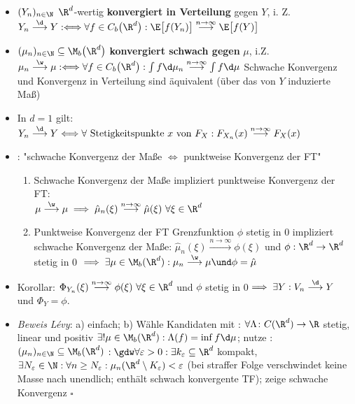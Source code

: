 	\begin{itemize}
		\item $(Y_n)_{n\in\N}$ $\R^d$-wertig \textbf{konvergiert in Verteilung} gegen $Y$, i. Z.
		$
		Y_n\overset{\d}{\longrightarrow}Y
		:\Longleftrightarrow\forall f\in C_b\big(\R^d\big):
		\E\big[f(Y_n)\big]\overset{n\to\infty}{\longrightarrow}\E\big[f(Y)\big]
		$
		\item $(\mu_n)_{n\in\N}\subseteq\M_b\big(\R^d\big)$ \textbf{konvergiert schwach gegen} $\mu$, i.Z.
		$
		\mu_n\overset{\w}{\longrightarrow}\mu 
		:\Longleftrightarrow\forall f\in C_b\big(\R^d\big):\int\limits f\d\mu_n\overset{n\to\infty}{\longrightarrow}\int\limits f\d\mu 
		$
		Schwache Konvergenz und Konvergenz in Verteilung sind äquivalent (über das von $Y$ induzierte Maß)
		\item In $d=1$ gilt: $Y_n\overset{\d}{\longrightarrow}Y
			\Longleftrightarrow\forall\text{ Stetigkeitspunkte $x$ von }F_X:
			F_{X_n}(x)\overset{n\to\infty}{\longrightarrow} F_X(x)
		$
		\item {}: "schwache Konvergenz der Maße $\Longleftrightarrow$ punktweise Konvergenz der FT"
		\begin{enumerate}
			\item Schwache Konvergenz der Maße impliziert punktweise Konvergenz der FT:\\
			$\mu\overset{\w}{\longrightarrow}\mu\implies\hat{\mu}_n(\xi)\overset{n\to\infty}{\longrightarrow}\hat{\mu}(\xi)~\forall\xi\in\R^d$
			\item Punktweise Konvergenz der FT  Grenzfunktion $\phi$ stetig in 0 impliziert schwache Konvergenz der Maße: $\hat{\mu}_n(\xi)\overset{n\to\infty}{\longrightarrow}\phi(\xi)$ und $\phi:\R^d\to\R^d$ stetig in 0 $\implies\exists\mu\in\M_b(\R^d):\mu_n\overset{\w}{\longrightarrow}\mu\und\phi=\hat{\mu}$
		\end{enumerate}
		\item Korollar: $\Phi_{Y_n}(\xi)\overset{n\to\infty}{\longrightarrow}\phi(\xi)~\forall\xi\in\R^d$ und $\phi$ stetig in 0$\implies\exists Y:V_n\overset{\d}{\longrightarrow}Y$ und $\Phi_Y=\phi$.
		\item \textit{Beweis Lévy}: a) einfach; b) 
		Wähle Kandidaten mit :
		$\forall\Lambda\colon C(\R^d)\to\R$ stetig, linear und positiv $\exists!\mu\in\M_b(\R^d):\Lambda(f)=\inf f\d\mu$;
		nutze :
		$(\mu_n)_{n\in\N}\subseteq\M_b(\R^d)$  $:\gdw\forall\varepsilon>0:\exists k_\varepsilon\subseteq\R^d$ kompakt, $\exists N_\varepsilon\in\N:\forall n\geq N_\varepsilon:\mu_n(\R^d\setminus K_\varepsilon)<\varepsilon$	
		(bei straffer Folge verschwindet keine Masse nach unendlich; enthält schwach konvergente TF); zeige schwache Konvergenz $\square$
	\end{itemize}
	
